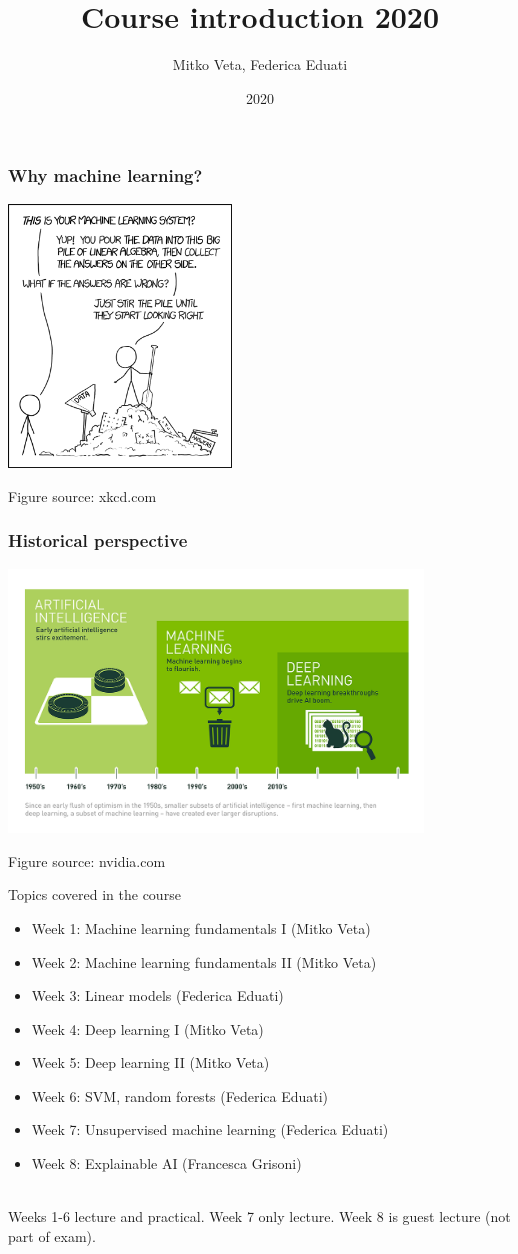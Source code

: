 \documentclass[notes]{beamer}          %
\title{Course introduction 2020}
\author{Mitko Veta, Federica Eduati}
\institute{Eindhoven University of Technology

Department of Biomedical Engineering}
\date{2020}
\begin{document}
 
\frame{\titlepage}

\begin{frame}
\frametitle{Why machine learning?}
\begin{center}
\includegraphics[height=7cm]{../figures/intro/machine_learning.png}
\end{center}
{\tiny Figure source: xkcd.com}
\end{frame}

\begin{frame}
\frametitle{Historical perspective}
\begin{center}
\includegraphics[height=7cm]{../figures/intro/deep_learning.png}
\end{center}
{\tiny Figure source: nvidia.com}
\end{frame}

\begin{frame}{Topics covered in the course}
\begin{itemize}
    \item Week 1: Machine learning fundamentals I (Mitko Veta)
    \item Week 2: Machine learning fundamentals II (Mitko Veta)
    \item Week 3: Linear models (Federica Eduati)
    \item Week 4: Deep learning I (Mitko Veta)
    \item Week 5: Deep learning II (Mitko Veta)
    \item Week 6: SVM, random forests (Federica Eduati)
    \item Week 7: Unsupervised machine learning (Federica Eduati) 
    \item Week 8: Explainable AI (Francesca Grisoni) 
\end{itemize}
$\,$\\
Weeks 1-6 lecture and practical. Week 7 only lecture. Week 8 is guest lecture (not part of exam).
\end{frame}
\end{document}
